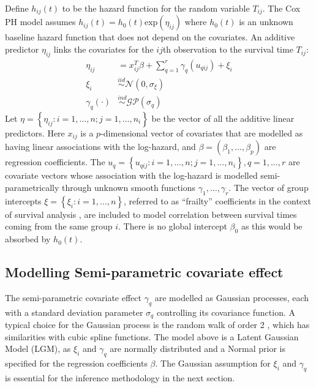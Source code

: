 \documentclass[ba]{imsart}
\begin{document}
Define $h_{ij}(t)$ to be the hazard function for the random variable $T_{ij}$. The Cox PH model assumes $h_{ij}(t) = h_0(t)\text{exp}(\eta_{ij})$ where $h_0(t)$ is an unknown baseline hazard function that does not depend on the covariates. An additive predictor $\eta_{ij}$ links the covariates for the $ij$th observation to the survival time $T_{ij}$:
\begin{equation}\begin{aligned}\label{eqn:eta}
\eta_{ij} &=x_{ij}^{T}\beta+\sum_{q=1}^{r} \gamma_q(u_{qij}) +\xi_{i} \\
\xi_i &\overset{iid}{\sim} \mathcal{N}(0,\sigma_{\xi}) \\
\gamma_{q}(\cdot) &\overset{ind}{\sim} \mathcal{GP}(\sigma_q)
\end{aligned}\end{equation}
Let $\eta = \left\{ \eta_{ij}: i = 1,\ldots,n; j = 1,\ldots,n_{i}\right\}$ be the vector of all the additive linear predictors. Here $x_{ij}$ is a $p$-dimensional vector of covariates that are modelled as having linear associations with the log-hazard, and $\beta = (\beta_{1},\ldots,\beta_{p})$ are regression coefficients. The $u_{q} = \left\{u_{qij}: i = 1,\ldots,n; j = 1,\ldots,n_{i} \right\}, q = 1,\ldots,r$ are covariate vectors whose association with the log-hazard is modelled semi-parametrically through unknown smooth functions $\gamma_1,\ldots,\gamma_r$. The vector of group intercepts $\xi = \left\{ \xi_{i}: i=1,\ldots,n\right\}$, referred to as ``frailty'' coefficients in the context of survival analysis \citep{frailty}, are included to model correlation between survival times coming from the same group $i$. There is no global intercept $\beta_{0}$ as this would be absorbed by $h_{0}(t)$.

\subsection{Modelling Semi-parametric covariate effect}\label{subsec:smooth}
The semi-parametric covariate effect $\gamma_q$ are modelled as Gaussian processes, each with a standard deviation parameter $\sigma_q$ controlling its covariance function. A typical choice
for the Gaussian process is the random walk of order 2 \citep{rw2}, which has similarities with cubic spline functions.
The model above is a Latent Gaussian Model (LGM), as $\xi_i$ and $\gamma_q$ are normally distributed and a Normal
prior is specified for the regression coefficients $\beta$. The Gaussian assumption for $\xi_i$ and $\gamma_q$ is essential for the inference methodology in the next section.
\end{document}

